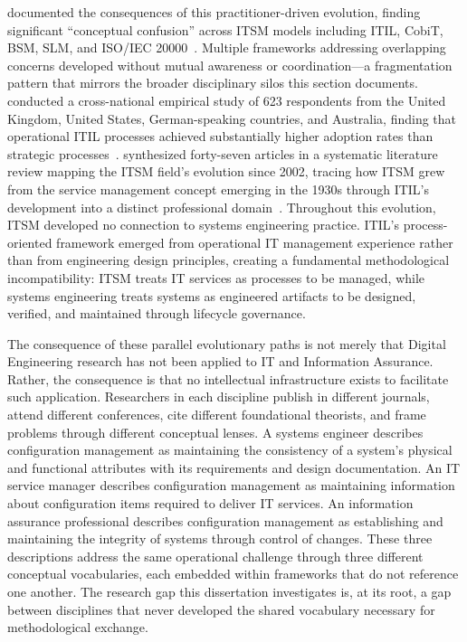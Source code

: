 \citeauthor{Winniford_2009} documented the consequences of this practitioner-driven evolution, finding significant ``conceptual confusion'' across ITSM models including ITIL, CobiT, BSM, SLM, and ISO/IEC 20000~\parencite{Winniford_2009}. Multiple frameworks addressing overlapping concerns developed without mutual awareness or coordination---a fragmentation pattern that mirrors the broader disciplinary silos this section documents. \citeauthor{Marrone_2014} conducted a cross-national empirical study of 623 respondents from the United Kingdom, United States, German-speaking countries, and Australia, finding that operational ITIL processes achieved substantially higher adoption rates than strategic processes~\parencite{Marrone_2014}. \citeauthor{Serrano_2021} synthesized forty-seven articles in a systematic literature review mapping the ITSM field's evolution since 2002, tracing how ITSM grew from the service management concept emerging in the 1930s through ITIL's development into a distinct professional domain~\parencite{Serrano_2021}. Throughout this evolution, ITSM developed no connection to systems engineering practice. ITIL's process-oriented framework emerged from operational IT management experience rather than from engineering design principles, creating a fundamental methodological incompatibility: ITSM treats IT services as processes to be managed, while systems engineering treats systems as engineered artifacts to be designed, verified, and maintained through lifecycle governance.

The consequence of these parallel evolutionary paths is not merely that Digital Engineering research has not been applied to IT and Information Assurance. Rather, the consequence is that no intellectual infrastructure exists to facilitate such application. Researchers in each discipline publish in different journals, attend different conferences, cite different foundational theorists, and frame problems through different conceptual lenses. A systems engineer describes configuration management as maintaining the consistency of a system's physical and functional attributes with its requirements and design documentation. An IT service manager describes configuration management as maintaining information about configuration items required to deliver IT services. An information assurance professional describes configuration management as establishing and maintaining the integrity of systems through control of changes. These three descriptions address the same operational challenge through three different conceptual vocabularies, each embedded within frameworks that do not reference one another. The research gap this dissertation investigates is, at its root, a gap between disciplines that never developed the shared vocabulary necessary for methodological exchange.

